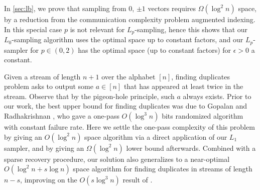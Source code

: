 In \autoref{sec:lb}, we prove that sampling from 0, $\pm1$
vectors requires $\Omega(\log^2 n)$ space, by a reduction from
the communication complexity problem augmented indexing. In this
special case $p$ is not relevant for $L_p$-sampling, hence this
shows that our $L_0$-sampling algorithm uses the optimal space
up to constant factors, and our $L_p$-sampler for $p\in(0,2)$
has the optimal space (up to constant factors) for $\epsilon>0$
a constant.

Given a stream of length $n+1$ over the alphabet $[n]$, finding
duplicates problem asks to output some $a\in[n]$ that has
appeared at least twice in the stream. Observe that by the
pigeon-hole principle, such $a$ always exists. Prior to our
work, the best upper bound for finding duplicates was due to
Gopalan and Radhakrishnan \cite{GopalanR2009}, who gave a
one-pass $O(\log^3 n)$ bits randomized algorithm with constant
failure rate. Here we settle the one-pass complexity of this
problem by giving an $O(\log^2 n)$ space algorithm via a direct
application of our $L_1$ sampler, and by giving an
$\Omega(\log^2 n)$ lower bound afterwards. Combined with a
sparse recovery procedure, our solution also generalizes to a
near-optimal $O(\log^2n+s\log n)$ space algorithm for finding
duplicates in streams of length $n-s$, improving on the
$O(s\log^3 n)$ result of \cite{GopalanR2009}.
  


